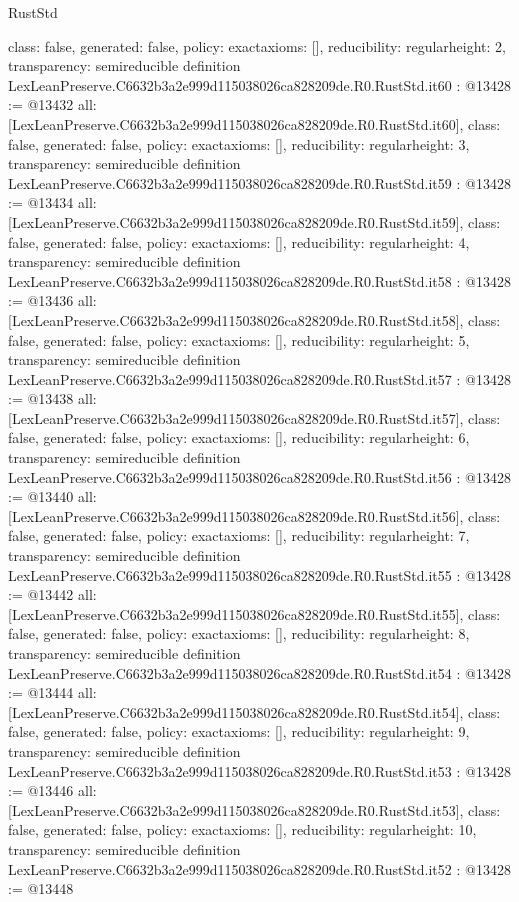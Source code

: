\begin{lexlean}{RustStd}
\begin{coremodule}
{  class: false,
  generated: false,
  policy: exact{axioms: []},
  reducibility: regular{height: 2},
  transparency: semireducible
}
definition LexLeanPreserve.C6632b3a2e999d115038026ca828209de.R0.RustStd.it60 : @13428 := @13432 {
  all: [LexLeanPreserve.C6632b3a2e999d115038026ca828209de.R0.RustStd.it60],
  class: false,
  generated: false,
  policy: exact{axioms: []},
  reducibility: regular{height: 3},
  transparency: semireducible
}
definition LexLeanPreserve.C6632b3a2e999d115038026ca828209de.R0.RustStd.it59 : @13428 := @13434 {
  all: [LexLeanPreserve.C6632b3a2e999d115038026ca828209de.R0.RustStd.it59],
  class: false,
  generated: false,
  policy: exact{axioms: []},
  reducibility: regular{height: 4},
  transparency: semireducible
}
definition LexLeanPreserve.C6632b3a2e999d115038026ca828209de.R0.RustStd.it58 : @13428 := @13436 {
  all: [LexLeanPreserve.C6632b3a2e999d115038026ca828209de.R0.RustStd.it58],
  class: false,
  generated: false,
  policy: exact{axioms: []},
  reducibility: regular{height: 5},
  transparency: semireducible
}
definition LexLeanPreserve.C6632b3a2e999d115038026ca828209de.R0.RustStd.it57 : @13428 := @13438 {
  all: [LexLeanPreserve.C6632b3a2e999d115038026ca828209de.R0.RustStd.it57],
  class: false,
  generated: false,
  policy: exact{axioms: []},
  reducibility: regular{height: 6},
  transparency: semireducible
}
definition LexLeanPreserve.C6632b3a2e999d115038026ca828209de.R0.RustStd.it56 : @13428 := @13440 {
  all: [LexLeanPreserve.C6632b3a2e999d115038026ca828209de.R0.RustStd.it56],
  class: false,
  generated: false,
  policy: exact{axioms: []},
  reducibility: regular{height: 7},
  transparency: semireducible
}
definition LexLeanPreserve.C6632b3a2e999d115038026ca828209de.R0.RustStd.it55 : @13428 := @13442 {
  all: [LexLeanPreserve.C6632b3a2e999d115038026ca828209de.R0.RustStd.it55],
  class: false,
  generated: false,
  policy: exact{axioms: []},
  reducibility: regular{height: 8},
  transparency: semireducible
}
definition LexLeanPreserve.C6632b3a2e999d115038026ca828209de.R0.RustStd.it54 : @13428 := @13444 {
  all: [LexLeanPreserve.C6632b3a2e999d115038026ca828209de.R0.RustStd.it54],
  class: false,
  generated: false,
  policy: exact{axioms: []},
  reducibility: regular{height: 9},
  transparency: semireducible
}
definition LexLeanPreserve.C6632b3a2e999d115038026ca828209de.R0.RustStd.it53 : @13428 := @13446 {
  all: [LexLeanPreserve.C6632b3a2e999d115038026ca828209de.R0.RustStd.it53],
  class: false,
  generated: false,
  policy: exact{axioms: []},
  reducibility: regular{height: 10},
  transparency: semireducible
}
definition LexLeanPreserve.C6632b3a2e999d115038026ca828209de.R0.RustStd.it52 : @13428 := @13448 {
}
\end{coremodule}
\end{lexlean}
